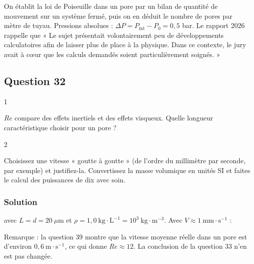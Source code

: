 \documentclass[11pt,a4paper]{article}
\newcommand{\equationajustee}[1]{%
  \sbox{\boiteequation}{$\displaystyle #1$}%
  \ifdim\wd\boiteequation>\linewidth
    \[\resizebox{\linewidth}{!}{\usebox{\boiteequation}}\]%
  \else
    \[#1\]%
  \fi}
\begin{document}
On établit la loi de Poiseuille dans un pore par un bilan de quantité de mouvement sur un système fermé, puis on en déduit le nombre de pores par mètre de tuyau. Pressions absolues : \(\Delta P=P_{\text{int}}-P_0=0{,}5\) bar. Le rapport 2026 rappelle que « Le sujet présentait volontairement peu de développements calculatoires afin de laisser plus de place à la physique. Dans ce contexte, le jury avait à cœur que les calculs demandés soient particulièrement soignés. »

\hypertarget{question-32}{%
\subsection{Question 32}\label{question-32}}

\begin{indication}{1}

\(Re\) compare des effets inertiels et des effets visqueux. Quelle longueur caractéristique choisir pour un pore ?

\end{indication}

\begin{indication}{2}

Choisissez une vitesse « goutte à goutte » (de l'ordre du millimètre par seconde, par exemple) et justifiez-la. Convertissez la masse volumique en unités SI et faites le calcul des puissances de dix avec soin.

\end{indication}

\hypertarget{solution-31}{%
\subsubsection{Solution}\label{solution-31}}

\equationajustee{Re=\frac{\rho VL}{\eta}}

avec \(L=d=20\ \mu\)m et \(\rho=1{,}0\ \mathrm{kg\cdot L^{-1}}=10^3\ \mathrm{kg\cdot m^{-3}}\). Avec \(V\approx1\ \mathrm{mm\cdot s^{-1}}\) :

\equationajustee{\begin{aligned}
Re&=\frac{10^3\times10^{-3}\times2\times10^{-5}}{10^{-3}}\\
&\approx\boxed{2\times10^{-2}}
\end{aligned}}

Remarque : la question 39 montre que la vitesse moyenne réelle dans un pore est d'environ \(0{,}6\ \mathrm{m\cdot s^{-1}}\), ce qui donne \(Re\approx12\). La conclusion de la question 33 n'en est pas changée.
\end{document}
